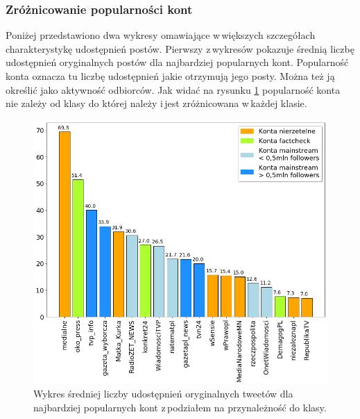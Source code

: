 \subsubsection{Zróżnicowanie popularności kont}
Poniżej przedstawiono dwa wykresy omawiające w\,większych szczegółach charakterystykę udostępnień postów. Pierwszy z\,wykresów pokazuje średnią liczbę udostępnień oryginalnych postów dla najbardziej popularnych kont. Popularność konta oznacza tu liczbę udostępnień jakie otrzymują jego posty. Można też ją określić jako aktywność odbiorców. Jak widać na rysunku \ref{fig:retweets-per-tweet} popularność konta nie zależy od klasy do której należy i\,jest zróżnicowana w\,każdej klasie.
\begin{figure}[!h]
	\centering \includegraphics[width=0.95\linewidth]{img/results/retweetspertweet.png}
	\caption{Wykres średniej liczby udostępnień oryginalnych tweetów dla najbardziej popularnych kont z\,podziałem na przynależność do klasy.} \label{fig:retweets-per-tweet}
\end{figure}

